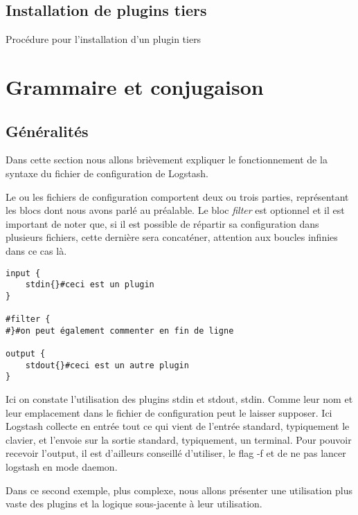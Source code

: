 \subsection{Installation de plugins tiers}
Procédure pour l'installation d'un plugin tiers



\section{Grammaire et conjugaison}
\subsection{Généralités}
Dans cette section nous allons brièvement expliquer le fonctionnement de la syntaxe 
du fichier de configuration de Logstash.

Le ou les fichiers de configuration comportent deux ou trois parties, représentant 
les blocs dont nous avons parlé au préalable. Le bloc \emph{filter} est optionnel
et il est important de noter que, si il est possible de répartir sa configuration
dans plusieurs fichiers, cette dernière sera concaténer, attention aux boucles infinies
dans ce cas là.

\begin{lstlisting}[style=logstash,label={lst:conflogstashminimale},caption={Configuration minimale}]
input {
    stdin{}#ceci est un plugin
}

#filter {
#}#on peut également commenter en fin de ligne

output {
    stdout{}#ceci est un autre plugin
}
\end{lstlisting}

Ici on constate l'utilisation des plugins stdin et stdout, stdin. Comme leur nom 
et leur emplacement dans le fichier de configuration peut le laisser supposer.
Ici Logstash collecte en entrée tout ce qui vient de l'entrée standard, typiquement
le clavier, et l'envoie sur la sortie standard, typiquement, un terminal.
Pour pouvoir recevoir l'output, il est d'ailleurs conseillé d'utiliser, le flag -f
et de ne pas lancer logstash en mode daemon.

Dans ce second exemple, plus complexe, nous allons présenter une utilisation plus
vaste des plugins et la logique sous-jacente à leur utilisation.

